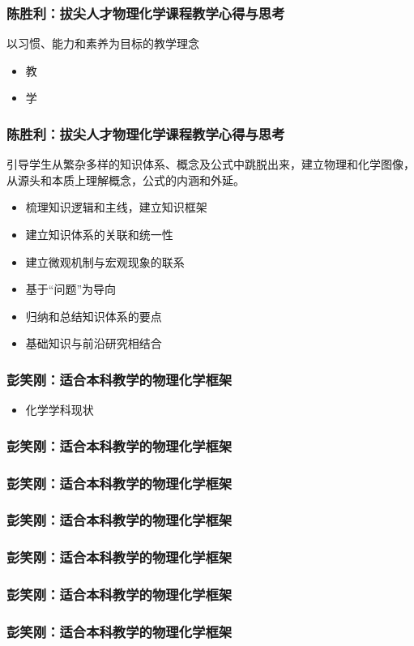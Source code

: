\documentclass[dvipsnames, svgnames, x11names]{beamer}
\begin{document}
\begin{frame}
    \frametitle{陈胜利：拔尖人才物理化学课程教学心得与思考}
    以习惯、能力和素养为目标的教学理念
    \begin{itemize}
      \item 教
      \item 学
    \end{itemize}
\end{frame}


\begin{frame}
    \frametitle{陈胜利：拔尖人才物理化学课程教学心得与思考}
    引导学生从繁杂多样的知识体系、概念及公式中跳脱出来，建立物理和化学图像，从源头和本质上理解概念，公式的内涵和外延。
    \begin{itemize}
      \item 梳理知识逻辑和主线，建立知识框架
      \item 建立知识体系的关联和统一性
      \item 建立微观机制与宏观现象的联系
      \item 基于“问题”为导向
      \item 归纳和总结知识体系的要点
      \item 基础知识与前沿研究相结合
    \end{itemize}
\end{frame}




\begin{frame}
    \frametitle{彭笑刚：适合本科教学的物理化学框架}
    \begin{itemize}
      \item 化学学科现状
    \end{itemize}
\end{frame}


\begin{frame}
    \frametitle{彭笑刚：适合本科教学的物理化学框架}
    
\end{frame}


\begin{frame}
  \frametitle{彭笑刚：适合本科教学的物理化学框架}
  
\end{frame}


\begin{frame}
  \frametitle{彭笑刚：适合本科教学的物理化学框架}
  
\end{frame}


\begin{frame}
  \frametitle{彭笑刚：适合本科教学的物理化学框架}
  
\end{frame}


\begin{frame}
  \frametitle{彭笑刚：适合本科教学的物理化学框架}
  
\end{frame}


\begin{frame}
  \frametitle{彭笑刚：适合本科教学的物理化学框架}
  
\end{frame}
\end{document}
